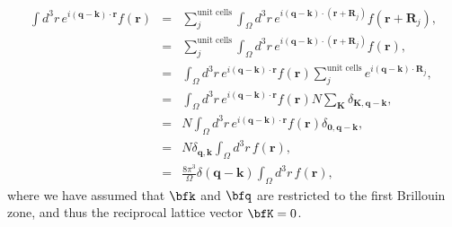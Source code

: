 \begin{align}\label{a_6}
\int d^{3}r\, e^{i(\mathbf{q}-\mathbf{k})\cdot\mathbf{r}}f(\mathbf{r})
& = &
\sum_{j}^{\mbox{unit cells}}\int_{\Omega}d^{3}r\,
e^{i(\mathbf{q}-\mathbf{k})\cdot(\mathbf{r}+\mathbf{R}_{j})}f(\mathbf{r}+\mathbf{R}_{j}),
\nonumber
\\
 & =&\sum_{j}^{\mbox{unit cells}}\int_{\Omega}d^{3}r\,
 e^{i(\mathbf{q}-\mathbf{k})\cdot(\mathbf{r}+\mathbf{R}_{j})}f(\mathbf{r}),
\nonumber
\\
 & =&\int_{\Omega}d^{3}r\, e^{i(\mathbf{q}-\mathbf{k})\cdot\mathbf{r}}f(\mathbf{r})\sum_{j}^{\mbox{unit cells}}e^{i(\mathbf{q}-\mathbf{k})\cdot\mathbf{R}_{j}},\nonumber
\\
 & =&\int_{\Omega}d^{3}r\, e^{i(\mathbf{q}-\mathbf{k})\cdot\mathbf{r}}f(\mathbf{r})N\sum_{\mathbf{K}}\delta_{\mathbf{K},\mathbf{q}-\mathbf{k}},\nonumber
\\
 & =&N\int_{\Omega}d^{3}r\, e^{i(\mathbf{q}-\mathbf{k})\cdot\mathbf{r}}f(\mathbf{r})\delta_{\mathbf{0},\mathbf{q}-\mathbf{k}},\nonumber
\\
 & =&N\delta_{\mathbf{q},\mathbf{k}}\int_{\Omega}d^{3}r\, f(\mathbf{r}),\nonumber
\\
 &
 =&\frac{8\pi^{3}}{\Omega}\delta(\mathbf{q}-\mathbf{k})\int_{\Omega}d^{3}r\,
 f(\mathbf{r})
,
\end{align}
where we have assumed that $\bfk$ and $\bfq$ are restricted to the
first Brillouin zone, and thus the reciprocal lattice vector $\bfK=0$.
